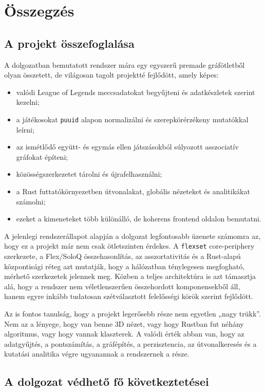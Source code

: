 \chapter{Összegzés}

\section{A projekt összefoglalása}

A dolgozatban bemutatott rendszer mára egy egyszerű premade gráfötletből olyan összetett, de világosan tagolt projektté fejlődött, amely képes:

\begin{itemize}
    \item valódi League of Legends meccsadatokat begyűjteni és adatkészletek szerint kezelni;
    \item a játékosokat \texttt{puuid} alapon normalizálni és szerepkörérzékeny mutatókkal leírni;
    \item az ismétlődő együtt- és egymás ellen játszásokból súlyozott asszociatív gráfokat építeni;
    \item közösségszerkezetet tárolni és újrafelhasználni;
    \item a Rust futtatókörnyezetben útvonalakat, globális nézeteket és analitikákat számolni;
    \item ezeket a kimeneteket több különálló, de koherens frontend oldalon bemutatni.
\end{itemize}

A jelenlegi rendszerállapot alapján a dolgozat legfontosabb üzenete számomra az, hogy ez a projekt már nem csak ötletszinten érdekes. A \texttt{flexset} core-periphery szerkezete, a Flex/SoloQ összehasonlítás, az asszortativitás és a Rust-alapú központisági réteg azt mutatják, hogy a hálózatban ténylegesen megfogható, mérhető szerkezetek jelennek meg. Közben a teljes architektúra is azt támasztja alá, hogy a rendszer nem véletlenszerűen összehordott komponensekből áll, hanem egyre inkább tudatosan szétválasztott felelősségi körök szerint fejlődött.

Az is fontos tanulság, hogy a projekt legerősebb része nem egyetlen „nagy trükk”. Nem az a lényege, hogy van benne 3D nézet, vagy hogy Rustban fut néhány algoritmus, vagy hogy vannak klaszterek. A valódi érték abban van, hogy az adatgyűjtés, a pontszámítás, a gráfépítés, a perzisztencia, az útvonalkeresés és a kutatási analitika végre ugyanannak a rendszernek a része.

\section{A dolgozat védhető fő következtetései}

